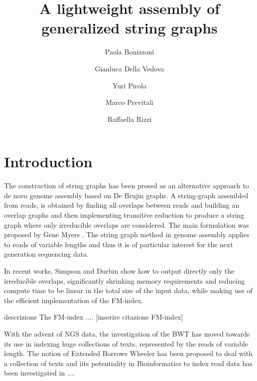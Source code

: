 \documentclass[runningheads,envcountsame,a4paper]{llncs}
\newcommand{\etal}{\textit{et al.}\xspace}
\begin{document}
\title{A lightweight  assembly of generalized string graphs}

\author{%
  Paola Bonizzoni \and
  Gianluca Della Vedova \and
  Yuri Pirola \and
  Marco Previtali \and
  Raffaella Rizzi
}
\authorrunning{Bonizzoni \etal}


\maketitle

\begin{abstract}


\end{abstract}

\section{Introduction}
The construction of  string graphs has been prosed as an alternative approach to de novo  genome assembly based on De Brujin graphs.
A string-graph assembled from reads, is obtained by finding all overlaps between reads and building an overlap graphs and  then implementing
transitive reduction to produce a string graph where only irreducible overlaps are considered.
The main  formulation was proposed by Gene Myers \cite{Myers05}.
The string graph method in genome assembly applies to reads of variable lengths and thus it is of particular interest for the next generation sequencing data.

In recent works, Simpson and Durbin \cite{Simpson10} show  how to output directly only the irreducible overlaps, significantly shrinking memory
requirements and reducing compute time to be linear in the total size of the input data, while making use of the efficient implementation of the FM-index.

descrizione The FM-index .... [inserire citazione FM-index]

 With the advent of NGS data, the investigation of the BWT has moved towards its use in indexing huge collections of texts, represented by the reads of variable length.
 The notion  of Extended Borrows Wheeler has been proposed to deal with a collection of texts \cite{Bauer11} and iits potentiality in  Bioinformatics  to index read data has been investigated in ....
\end{document}
